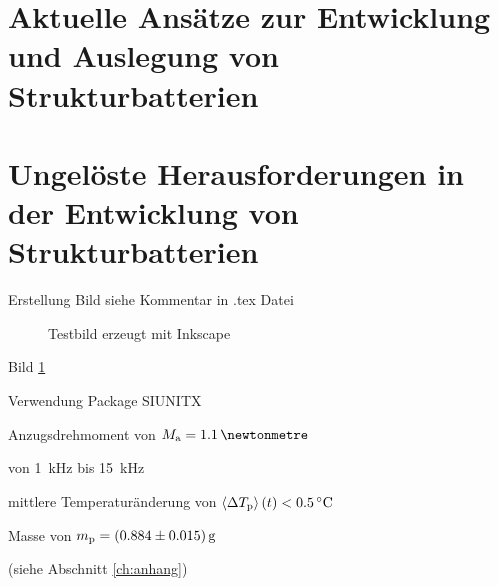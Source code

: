 \section{Aktuelle Ansätze zur Entwicklung und Auslegung von Strukturbatterien}

\section{Ungelöste Herausforderungen in der Entwicklung von Strukturbatterien}
Erstellung Bild siehe Kommentar in .tex Datei


\begin{figure}[h]
	\def\svgscale{0.98}
		 
		\caption{\label{fig:testbild}Testbild erzeugt mit Inkscape}
\end{figure}

Bild \ref{fig:testbild} %

Verwendung Package SIUNITX %

Anzugsdrehmoment von $M_{\textnormal{a}}=\SI{1.1}{\newtonmetre}$

von \SI{1}{\kilo\hertz} bis \SI{15}{\kilo\hertz}

mittlere Temperaturänderung von $\left\langle \Delta T_{\textnormal{p}}\right\rangle(t)<\SI{0.5}{\degreeCelsius}$

Masse von $m_{\textnormal{p}}=\SI[separate-uncertainty]{0.884 (15)}{\gram}$

(siehe Abschnitt \ref{ch:anhang})